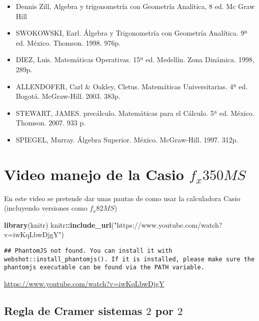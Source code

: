 \documentclass[]{book}
\newenvironment{Shaded}{\begin{snugshade}}{\end{snugshade}}
\newcommand{\KeywordTok}[1]{\textcolor[rgb]{0.13,0.29,0.53}{\textbf{#1}}}
\newcommand{\NormalTok}[1]{#1}
\newcommand{\OperatorTok}[1]{\textcolor[rgb]{0.81,0.36,0.00}{\textbf{#1}}}
\newcommand{\StringTok}[1]{\textcolor[rgb]{0.31,0.60,0.02}{#1}}
\theoremstyle{definition}
\theoremstyle{definition}
\theoremstyle{definition}
\theoremstyle{remark}
\begin{document}
\begin{itemize}
\item
  Dennis Zill, Algebra y trigonometría con Geometría Analítica, 8 ed. Mc Graw Hill
\item
  SWOKOWSKI, Earl. Álgebra y Trigonometría con Geometría Analítica. 9ª ed. México. Thomson. 1998. 976p.
\item
  DIEZ, Luis. Matemáticas Operativas. 15ª ed. Medellín. Zona Dinámica. 1998, 289p.
\item
  ALLENDOFER, Carl \& Oakley, Cletus. Matemáticas Universitarias. 4ª ed. Bogotá. McGraw-Hill. 2003. 383p.
\item
  STEWART, JAMES. precálculo. Matemáticas para el Cálculo. 5ª ed. México. Thomson. 2007. 933 p.
\item
  SPIEGEL, Murray. Álgebra Superior. México. McGraw-Hill. 1997. 312p.
\end{itemize}

\hypertarget{video-manejo-de-la-casio-f_x350ms}{%
\section{\texorpdfstring{Video manejo de la Casio \(f_{x}350MS\)}{Video manejo de la Casio f\_\{x\}350MS}}\label{video-manejo-de-la-casio-f_x350ms}}

En este video se pretende dar unas pautas de como usar
la calculadora Casio (incluyendo versiones como \(f_{x}82MS\))

\begin{Shaded}
\begin{Highlighting}[]
\KeywordTok{library}\NormalTok{(knitr)}
\NormalTok{knitr}\OperatorTok{::}\KeywordTok{include_url}\NormalTok{(}\StringTok{"https://www.youtube.com/watch?v=iwKqLbwDjgY"}\NormalTok{)}
\end{Highlighting}
\end{Shaded}

\begin{verbatim}
## PhantomJS not found. You can install it with webshot::install_phantomjs(). If it is installed, please make sure the phantomjs executable can be found via the PATH variable.
\end{verbatim}

\url{https://www.youtube.com/watch?v=iwKqLbwDjgY}

\hypertarget{regla-de-cramer-sistemas-2-por-2}{%
\subsection{\texorpdfstring{Regla de Cramer sistemas \(2\) por \(2\)}{Regla de Cramer sistemas 2 por 2}}\label{regla-de-cramer-sistemas-2-por-2}}
\end{document}

